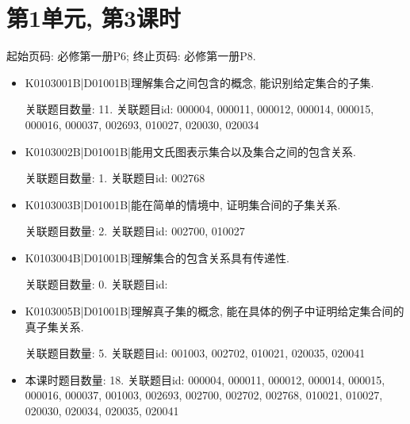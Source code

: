 \section*{第1单元, 第3课时}
起始页码: 必修第一册P6; 终止页码: 必修第一册P8.
\begin{itemize}
\item K0103001B|D01001B|理解集合之间包含的概念, 能识别给定集合的子集.

关联题目数量: 11. 关联题目id: 000004, 000011, 000012, 000014, 000015, 000016, 000037, 002693, 010027, 020030, 020034

\item K0103002B|D01001B|能用文氏图表示集合以及集合之间的包含关系.

关联题目数量: 1. 关联题目id: 002768

\item K0103003B|D01001B|能在简单的情境中, 证明集合间的子集关系.

关联题目数量: 2. 关联题目id: 002700, 010027

\item K0103004B|D01001B|理解集合的包含关系具有传递性.

关联题目数量: 0. 关联题目id: 

\item K0103005B|D01001B|理解真子集的概念, 能在具体的例子中证明给定集合间的真子集关系.

关联题目数量: 5. 关联题目id: 001003, 002702, 010021, 020035, 020041

\item 本课时题目数量: 18. 关联题目id: 000004, 000011, 000012, 000014, 000015, 000016, 000037, 001003, 002693, 002700, 002702, 002768, 010021, 010027, 020030, 020034, 020035, 020041

\end{itemize}

